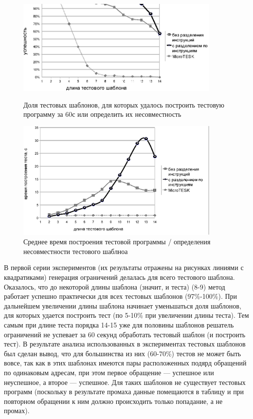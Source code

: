 \begin{figure}[p] \center
\parbox[t]{0.9\textwidth}{
  \includegraphics[width=0.9\textwidth]{4.analysis/success_exprmnt}%
\caption{Доля тестовых шаблонов, для которых удалось построить тестовую программу за 60с или определить их несовместность}\label{fig:success_experiment}
}

\vspace{1.5cm}

\parbox[t]{0.9\textwidth}{
  \includegraphics[width=0.9\textwidth]{4.analysis/time_exprmnt}
  \caption{Среднее время построения тестовой программы / определения несовместности тестового шаблноа}\label{fig:time_experiment}
}
\end{figure}

В первой серии экспериментов (их результаты отражены на рисунках линиями с
квадратиками) генерация ограничений делалась для всего тестового шаблона.
Оказалось, что до некоторой длины шаблона (значит, и теста) (8-9) метод работает
успешно практически для всех тестовых шаблонов (97\%-100\%). При дальнейшем
увеличении длины шаблона начинает уменьшаться доля шаблонов, для которых удается
построить тест (по 5-10\% при увеличении длины теста). Тем самым при длине теста
порядка 14-15 уже для половины шаблонов решатель ограничений не успевает за 60
секунд обработать тестовый шаблон (и построить тест). В результате анализа использованных в
экспериментах тестовых шаблонов был сделан вывод, что для большинства из них
(60-70\%) тестов не может быть вовсе, так как в этих шаблонах имеются пары расположенных подярд обращений
по одинаковым адресам, при этом первое обращение --- успешное или неуспешное, а второе --- успешное. Для таких шаблонов не существует тестовых программ (поскольку в результате промаха данные помещаются в таблицу и при повторном обращении к ним должно происходить только попадание, а не промах).

